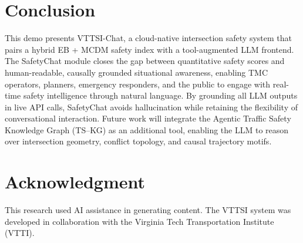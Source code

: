 \documentclass[conference]{IEEEtran}
\begin{document}
\section{Conclusion}
\label{sec:conclusion}

This demo presents VTTSI-Chat, a cloud-native intersection safety system that pairs a
hybrid EB + MCDM safety index with a tool-augmented LLM frontend.
The SafetyChat module closes the gap between quantitative safety scores and
human-readable, causally grounded situational awareness, enabling TMC operators,
planners, emergency responders, and the public to engage with real-time safety
intelligence through natural language.
By grounding all LLM outputs in live API calls, SafetyChat avoids hallucination while
retaining the flexibility of conversational interaction.
Future work will integrate the Agentic Traffic Safety Knowledge Graph (TS--KG)
\cite{cusati2025agentickg} as an additional tool, enabling the LLM to reason over
intersection geometry, conflict topology, and causal trajectory motifs.

\section*{Acknowledgment}
This research used AI assistance in generating content. The VTTSI system was developed
in collaboration with the Virginia Tech Transportation Institute (VTTI).

\printbibliography
\end{document}
